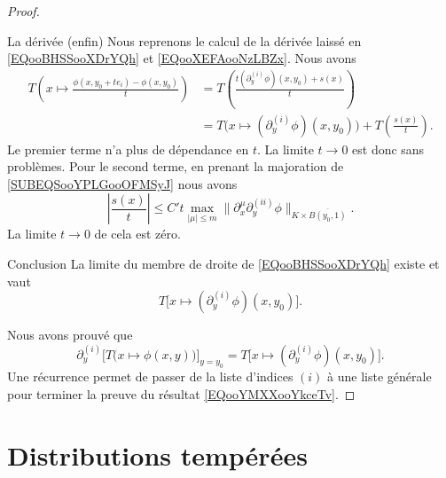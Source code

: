 \begin{proof}
\begin{subproof}
\begin{itemize}
            \end{itemize}
        \item[La dérivée (enfin)]
            Nous reprenons le calcul de la dérivée laissé en \eqref{EQooBHSSooXDrYQh} et \eqref{EQooXEFAooNzLBZx}. Nous avons
            \begin{subequations}
                \begin{align}
                    T\left( x\mapsto\frac{ \phi(x,y_0+te_i)-\phi(x,y_0) }{ t } \right)&=T\left( \frac{ t(\partial_y^{(i)}\phi)(x,y_0)+s(x) }{ t }\right)\\
                    &=T\Big( x\mapsto (\partial_y^{(i)}\phi)(x,y_0) \Big)+T\left( \frac{ s(x) }{ t } \right).
                \end{align}
            \end{subequations}
            Le premier terme n'a plus de dépendance en \( t\). La limite \( t\to 0\) est donc sans problèmes. Pour le second terme, en prenant la majoration de \eqref{SUBEQSooYPLGooOFMSyJ} nous avons
            \begin{equation}
                | \frac{ s(x) }{ t } |\leq C't\max_{| \mu |\leq m}\| \partial_x^{\mu}\partial_y^{(ii)}\phi \|_{K\times \overline{ B(y_0,1) }}.
            \end{equation}
            La limite \( t\to 0\) de cela est zéro.
        \item[Conclusion]
            La limite du membre de droite de \eqref{EQooBHSSooXDrYQh} existe et vaut
            \begin{equation}
                T\Big[x\mapsto (\partial_y^{(i)}\phi)(x,y_0) \Big].
            \end{equation}
    \end{subproof}
    Nous avons prouvé que
    \begin{equation}
        \partial^{(i)}_y\Big[ T\big( x\mapsto\phi(x,y) \big) \Big]_{y=y_0}=T\Big[ x\mapsto (\partial^{(i)}_y\phi)(x,y_0) \Big].
    \end{equation}
    Une récurrence permet de passer de la liste d'indices \( (i)\) à une liste générale pour terminer la preuve du résultat \eqref{EQooYMXXooYkceTv}.
\end{proof}



\section{Distributions tempérées}

